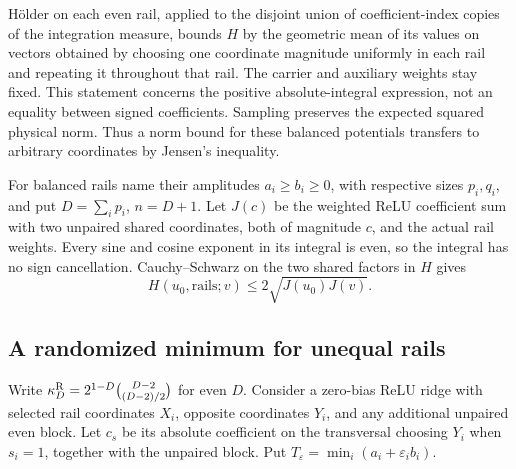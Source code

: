 H\"older on each even rail, applied to the disjoint union of
coefficient-index copies of the integration measure, bounds $H$ by
the geometric mean of its values on vectors obtained by choosing one
coordinate magnitude uniformly in each rail and repeating it throughout
that rail. The carrier and auxiliary weights stay fixed. This statement
concerns the positive absolute-integral expression, not an equality
between signed coefficients. Sampling preserves the expected squared
physical norm. Thus a norm bound for these balanced potentials
transfers to arbitrary coordinates by Jensen's inequality.

For balanced rails name their amplitudes $a_i\ge b_i\ge0$, with
respective sizes $p_i,q_i$, and put $D=\sum_i p_i$, $n=D+1$.
Let $J(c)$ be the weighted ReLU coefficient sum with two unpaired
shared coordinates, both of magnitude $c$, and the actual rail weights.
Every sine and cosine exponent in its integral is even, so the integral
has no sign cancellation. Cauchy--Schwarz on the two shared factors
in $H$ gives
\begin{equation}\label{eq:shared-cauchy}
 H(u_0,\mathrm{rails};v)\le2\sqrt{J(u_0)J(v)}.
\end{equation}

\subsection{A randomized minimum for unequal rails}

Write $\kappa_D^{\rm R}=2^{1-D}\binom{D-2}{(D-2)/2}$ for even $D$.
Consider a zero-bias ReLU ridge with selected rail coordinates $X_i$,
opposite coordinates $Y_i$, and any additional unpaired even block.
Let $c_s$ be its absolute coefficient on the transversal choosing $Y_i$
when $s_i=1$, together with the unpaired block.
Put $T_\varepsilon=\min_i(a_i+\varepsilon_i b_i)$.

